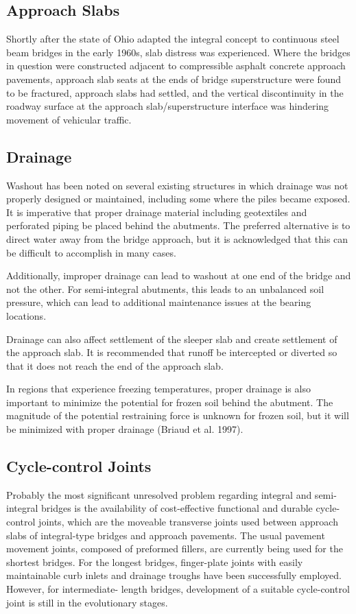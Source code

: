 \subsection{Approach Slabs}
Shortly after the state of Ohio adapted the integral concept to continuous steel beam bridges in the early 1960s,
slab distress was experienced. Where the bridges in question were constructed adjacent to compressible asphalt
concrete approach pavements, approach slab seats at the ends of bridge superstructure were found to be fractured,
approach slabs had settled, and the vertical discontinuity in the roadway surface at the approach slab/superstructure
interface was hindering movement of vehicular traffic.

\subsection{Drainage}
Washout has been noted on several existing structures in which drainage was not properly designed or
maintained, including some where the piles became exposed. It is imperative that proper drainage material including
geotextiles and perforated piping be placed behind the abutments. The preferred alternative is to direct water away
from the bridge approach, but it is acknowledged that this can be difficult to accomplish in many cases.

Additionally, improper drainage can lead to washout at one end of the bridge and not the other. For semi-integral
abutments, this leads to an unbalanced soil pressure, which can lead to additional maintenance issues at the bearing
locations.

Drainage can also affect settlement of the sleeper slab and create settlement of the approach slab. It is
recommended that runoff be intercepted or diverted so that it does not reach the end of the approach slab.

In regions that experience freezing temperatures, proper drainage is also important to minimize the potential for
frozen soil behind the abutment. The magnitude of the potential restraining force is unknown for frozen soil, but it
will be minimized with proper drainage (Briaud et al. 1997).

\subsection{Cycle-control Joints}
Probably the most significant unresolved problem regarding integral and semi-integral bridges is the availability
of cost-effective functional and durable cycle-control joints, which are the moveable transverse joints used between
approach slabs of integral-type bridges and approach pavements. The usual pavement movement joints, composed of
preformed fillers, are currently being used for the shortest bridges. For the longest bridges, finger-plate joints with
easily maintainable curb inlets and drainage troughs have been successfully employed. However, for intermediate-
length bridges, development of a suitable cycle-control joint is still in the evolutionary stages.

